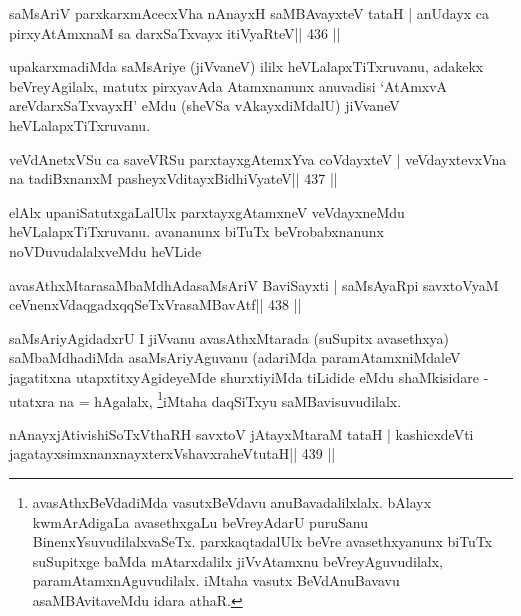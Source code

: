 \begin{shl}
saMsAriV parxkarxmAcecxVha nAnayxH saMBAvayxteV tataH |
anUdayx ca pirxyAtAmxnaM sa darxSaTxvayx itiVyaRteV\hfill || 436 ||
\end{shl}


\begin{artha}
upakarxmadiMda saMsAriye (jiVvaneV) ililx heVLalapxTiTxruvanu, adakekx
beVreyAgilalx, matutx pirxyavAda Atamxnanunx anuvadisi `AtAmxvA
areVdarxSaTxvayxH' eMdu (sheVSa vAkayxdiMdalU) jiVvaneV
heVLalapxTiTxruvanu.
\end{artha}


\begin{shl}
veVdAnetxVSu ca saveVRSu parxtayxgAtemxYva coVdayxteV |
veVdayxtevxVna na tadiBxnanxM pasheyxVditayxBidhiVyateV\hfill || 437 ||
\end{shl}

\begin{artha}
elAlx upaniSatutxgaLalUlx parxtayxgAtamxneV veVdayxneMdu
heVLalapxTiTxruvanu. avananunx biTuTx beVrobabxnanunx
noVDuvudalalxveMdu heVLide
\end{artha}


\begin{shl}
avasAthxMtarasaMbaMdhAdasaMsAriV BaviSayxti |
saMsAyaRpi savxtoV\s yaM ceVnenxVdaqgadxqqSeTxVrasaMBavAtf\hfill || 438 ||
\end{shl}

\begin{artha}
saMsAriyAgidadxrU I jiVvanu avasAthxMtarada (suSupitx avasethxya)
saMbaMdhadiMda asaMsAriyAguvanu (adariMda paramAtamxniMdaleV
jagatitxna utapxtitxyAgideyeMde shurxtiyiMda tiLidide eMdu
shaMkisidare - utatxra na = hAgalalx, \footnote[1]{avasAthxBeVdadiMda 
vasutxBeVdavu anuBavadalilxlalx. bAlayx
kwmArAdigaLa avasethxgaLu beVreyAdarU puruSanu
BinenxYsuvudilalxvaSeTx. parxkaqtadalUlx beVre avasethxyanunx biTuTx
suSupitxge baMda mAtarxdalilx jiVvAtamxnu beVreyAguvudilalx,
paramAtamxnAguvudilalx. iMtaha vasutx BeVdAnuBavavu asaMBAvitaveMdu
idara athaR.}iMtaha daqSiTxyu saMBavisuvudilalx.
\end{artha}



\begin{shl}
nAnayxjAtivishiSoTxV\s thaRH savxtoV jAtayxMtaraM tataH |
kashicxdeVti jagatayxsimxnanxnayxterxVshavxraheVtutaH\hfill || 439 ||
\end{shl}

